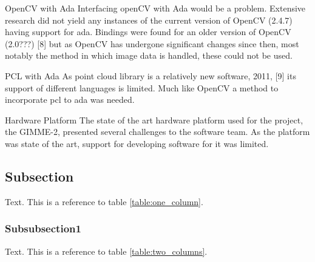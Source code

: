 OpenCV with Ada
Interfacing openCV with Ada would be a problem. Extensive research did not yield any instances of the current version of OpenCV (2.4.7) having support for ada. Bindings were found for an older version of OpenCV (2.0???) [8] but as OpenCV has undergone significant changes since then, most notably the method in which image data is handled, these could not be used.

PCL with Ada
As point cloud library is a relatively new software, 2011, [9] its support of different languages is limited. Much like OpenCV a method to incorporate pcl to ada was needed.

Hardware Platform
The state of the art hardware platform used for the project, the GIMME-2, presented several challenges to the software team. As the platform was state of the art, support for developing software for it was limited.


\subsection{Subsection}
Text. This is a reference to table \ref{table:one_column}.
\subsubsection{Subsubsection1}
Text. This is a reference to table \ref{table:two_columns}.
